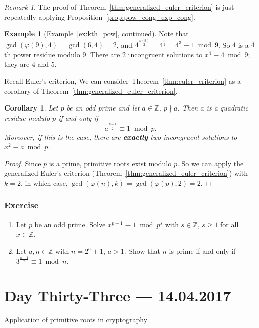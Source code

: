 \documentclass{amsbook}
\theoremstyle{plain}
\newtheorem{corollary}[theorem]{Corollary}
\theoremstyle{definition}
\newtheorem{example}[theorem]{Example}
\theoremstyle{remark}
\newtheorem{remark}[theorem]{Remark}
\numberwithin{equation}{chapter}
\numberwithin{figure}{chapter}
\newcommand{\Z}{\mathbb{Z}}
\begin{document}
\begin{remark}
  The proof of Theorem~\ref{thm:generalized_euler_criterion} is just repeatedly applying Proposition~\ref{prop:pow_cong_exp_cong}.
\end{remark}
\begin{example}[Example~\ref{ex:kth_pow}, continued]
  Note that $\gcd (\varphi (9), 4) = \gcd (6, 4) = 2$, and $4^{\frac{\varphi (9)}2} = 4^{\frac{6}2} = 4^3 \equiv 1 \bmod 9$. So $4$ is a $4$th power residue modulo $9$. There are $2$ incongruent solutions to $x^4 \equiv 4 \bmod 9$; they are $4$ and $5$.
\end{example}
Recall Euler's criterion,
\eulercriterion*
We can consider Theorem~\ref{thm:euler_criterion} as a corollary of Theorem~\ref{thm:generalized_euler_criterion}.
\begin{corollary}
  Let $p$ be an odd prime and let $a \in \Z$, $p \nmid a$. Then $a$ is a quadratic residue modulo $p$ if and only if
  \[
    a^{\frac{p-1}2} \equiv 1 \bmod p.
  \]
  Moreover, if this is the case, there are \textbf{exactly} two incongruent solutions to $x^2 \equiv a \bmod p$.
\end{corollary}
\begin{proof}
  Since $p$ is a prime, primitive roots exist modulo $p$. So we can apply the generalized Euler's criterion (Theorem~\ref{thm:generalized_euler_criterion}) with $k = 2$, in which case, $\gcd (\varphi (n), k) = \gcd (\varphi (p), 2) = 2$.
\end{proof}
\subsection*{Exercise}
\begin{enumerate}
\item Let $p$ be an odd prime. Solve $x^{p-1} \equiv 1 \bmod p^s$ with $s \in \Z$, $s \geqslant 1$ for all $x \in \Z$.
\item Let $a, n \in \Z$ with $n = 2^a + 1$, $a > 1$. Show that $n$ is prime if and only if $3^{\frac{n-1}2} \equiv 1 \bmod n$.
\end{enumerate}
\chapter[Lecture Thirty-Three]{Day Thirty-Three \hfill {\footnotesize \rm --- 14.04.2017}}

\underline{A}pp\underline{lication of }p\underline{rimitive roots in cr}yp\underline{to}g\underline{ra}p\underline{h}y \\
\end{document}
